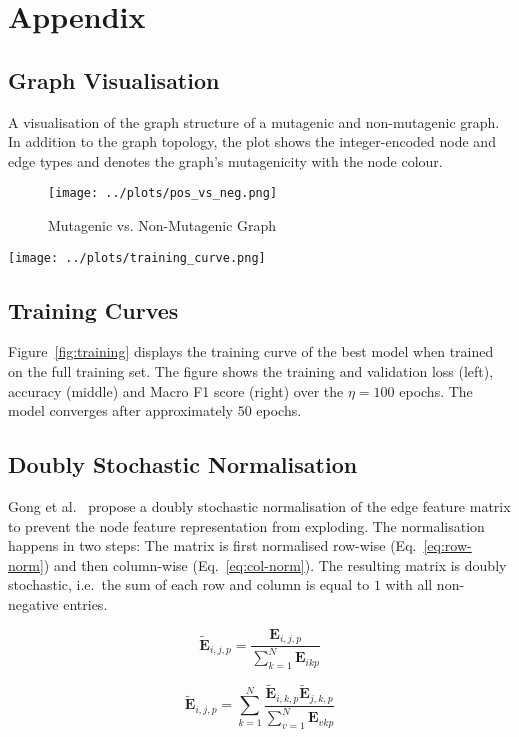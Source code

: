 \documentclass[10pt,conference,compsocconf]{IEEEtran}
\begin{document}
\newpage



\section{Appendix}

\subsection{Graph Visualisation}

A visualisation of the graph structure of a mutagenic and non-mutagenic graph.
In addition to the graph topology, the plot shows the integer-encoded node and
edge types and denotes the graph's mutagenicity with the node colour.

\begin{figure}[h!]
  \texttt{[image: ../plots/pos\_vs\_neg.png]}
  \caption{Mutagenic vs. Non-Mutagenic Graph}
  \label{fig:graph}
\end{figure}


\begin{figure*}[b]
  \centering
  \texttt{[image: ../plots/training\_curve.png]}
  \caption{Example Training Curve}
  \label{fig:training}
\end{figure*}

\subsection{Training Curves}

Figure~\ref{fig:training} displays the training curve of the best model when
trained on the full training set. The figure shows the training and validation
loss (left), accuracy (middle) and Macro F1 score (right) over the $\eta = 100$
epochs. The model converges after approximately $50$ epochs.

\subsection{Doubly Stochastic Normalisation}

Gong et al.~\cite{egnn} propose a doubly stochastic normalisation of the edge
feature matrix to prevent the node feature representation from exploding. The
normalisation happens in two steps: The matrix is first normalised row-wise
(Eq.~\ref{eq:row-norm}) and then column-wise (Eq.~\ref{eq:col-norm}). The
resulting matrix is doubly stochastic, i.e.\ the sum of each row and column is
equal to $1$ with all non-negative entries.

\begin{equation}
   \tilde{\mathbf{E}}_{i,j,p} = 
   \frac{\mathbf{E}_{i,j,p}}{\sum_{k=1}^N \mathbf{E}_{ikp}}
   \label{eq:row-norm}
\end{equation}
 
\begin{equation}
  \tilde{\mathbf{E}}_{i,j,p} = 
  \sum_{k=1}^{N}
  \frac{\tilde{\mathbf{E}}_{i,k,p}\tilde{\mathbf{E}}_{j,k,p}}{\sum_{v=1}^N \mathbf{E}_{vkp}}
  \label{eq:col-norm}
\end{equation}
\end{document}
